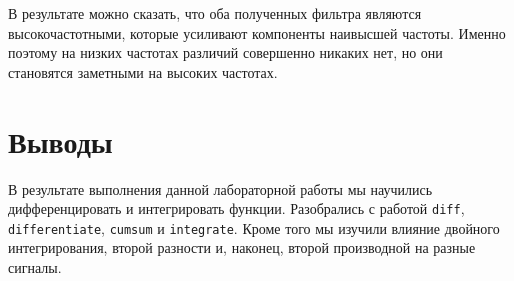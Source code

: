 \documentclass[a4paper]{article}
\begin{document}
            В результате можно сказать, что оба полученных фильтра являются высокочастотными, которые усиливают компоненты наивысшей частоты. Именно поэтому на низких частотах различий совершенно никаких нет, но они становятся заметными на высоких частотах.
            
    \newpage
        \section{Выводы}
             В результате выполнения данной лабораторной работы мы научились дифференцировать и интегрировать функции. Разобрались с работой \texttt{diff}, \\\texttt{differentiate}, \texttt{cumsum} и \texttt{integrate}. Кроме того мы изучили влияние двойного интегрирования, второй разности и, наконец, второй производной  на разные сигналы.
            
\end{document}
